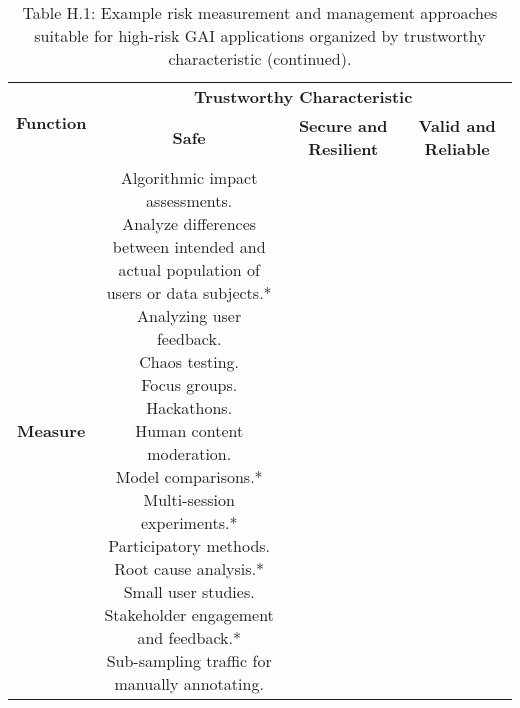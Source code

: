 \documentclass[fleqn]{article}
\begin{document}
\begin{landscape}
\begin{table}[H]
	\caption*{Table H.1: Example risk measurement and management approaches suitable for high-risk GAI applications organized by trustworthy characteristic (continued).}
	\footnotesize
	\begin{tabular}{|c|c|c|c|}
		\hline
		\multirow{2}{*}{\textbf{Function}} & \multicolumn{3}{|c|}{\textbf{Trustworthy Characteristic}}   \\
		\cline{2-4}
		& \textbf{Safe} & \textbf{Secure and Resilient} & \textbf{Valid and Reliable} \\
		\hline
		\textbf{Measure} & 
		\makecell[l]{
			\textbullet\hspace{3pt} Algorithmic impact assessments.\\ 	
			\textbullet\hspace{3pt} Analyze differences between intended and \\\hspace{10pt}actual population of users or data subjects.*\\	
			\textbullet\hspace{3pt} Analyzing user feedback. \\	
			\textbullet\hspace{3pt} Chaos testing. \\
			\textbullet\hspace{3pt} Focus groups. \\
			\textbullet\hspace{3pt} Hackathons. \\
			\textbullet\hspace{3pt} Human content moderation. \\
			\textbullet\hspace{3pt} Model comparisons.* \\
			\textbullet\hspace{3pt} Multi-session experiments.* \\
			\textbullet\hspace{3pt} Participatory methods. \\			
			\textbullet\hspace{3pt} Root cause analysis.* \\			
			\textbullet\hspace{3pt} Small user studies. \\			
			\textbullet\hspace{3pt} Stakeholder engagement and feedback.* \\
			\textbullet\hspace{3pt} Sub-sampling traffic for manually annotating. \\
}
\end{tabular}
\end{table}
\end{landscape}
\end{document}
